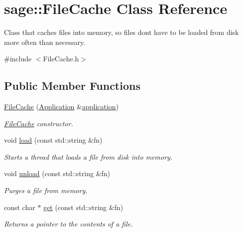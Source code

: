 \hypertarget{classsage_1_1FileCache}{}\section{sage\+::File\+Cache Class Reference}
\label{classsage_1_1FileCache}


Class that caches files into memory, so files don\textquotesingle{}t have to be loaded from disk more often than necessary.  




{\ttfamily \#include $<$File\+Cache.\+h$>$}

\subsection*{Public Member Functions}
\begin{DoxyCompactItemize}
\item 
\mbox{\hyperlink{classsage_1_1FileCache_af88bef81fc34d1a1576d57c4e0261358}{File\+Cache}} (\mbox{\hyperlink{classsage_1_1Application}{Application}} \&\mbox{\hyperlink{classsage_1_1FileCache_a4ff6c40a790b7e9ed42c05a7dd426872}{application}})
\begin{DoxyCompactList}\small\item\em \mbox{\hyperlink{classsage_1_1FileCache}{File\+Cache}} constructor. \end{DoxyCompactList}\item 
void \mbox{\hyperlink{classsage_1_1FileCache_addb15593e848f038a5d7a7c6c3828053}{load}} (const std\+::string \&fn)
\begin{DoxyCompactList}\small\item\em Starts a thread that loads a file from disk into memory. \end{DoxyCompactList}\item 
void \mbox{\hyperlink{classsage_1_1FileCache_a902a36451f11c4b6e4267358bfadb024}{unload}} (const std\+::string \&fn)
\begin{DoxyCompactList}\small\item\em Purges a file from memory. \end{DoxyCompactList}\item 
const char $\ast$ \mbox{\hyperlink{classsage_1_1FileCache_a67fe1af6ccb8d06b7e97dc54a1836eee}{get}} (const std\+::string \&fn)
\begin{DoxyCompactList}\small\item\em Returns a pointer to the contents of a file. \end{DoxyCompactList}\item 

\end{DoxyCompactItemize}
